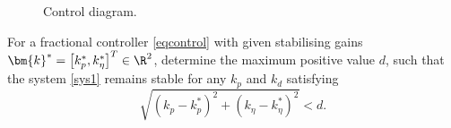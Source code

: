 \documentclass[twoside,reqno,11pt]{fcaa-var} %
\begin{document}
\begin{problem}
\begin{figure}
\begin{adjustbox}{max width=\columnwidth}
		\end{adjustbox}
		\caption{Control diagram.} \label{GCDiagram}
	\end{figure}
\end{problem}
\begin{problem}
	For a fractional controller \eqref{eqcontrol} with given stabilising gains $\bm{k}^*=\left[k_p^*,k_\eta^*\right]^T\in\R^2$, determine the maximum  positive value $d$, such that the system \eqref{sys1} remains stable for any $k_p$ and $k_d$ satisfying
	\begin{equation}
	\sqrt{(k_p-k_p^*)^2+(k_\eta-k_\eta^*)^2}<d.
	\end{equation}
\end{problem}
\smallskip
\end{document}
